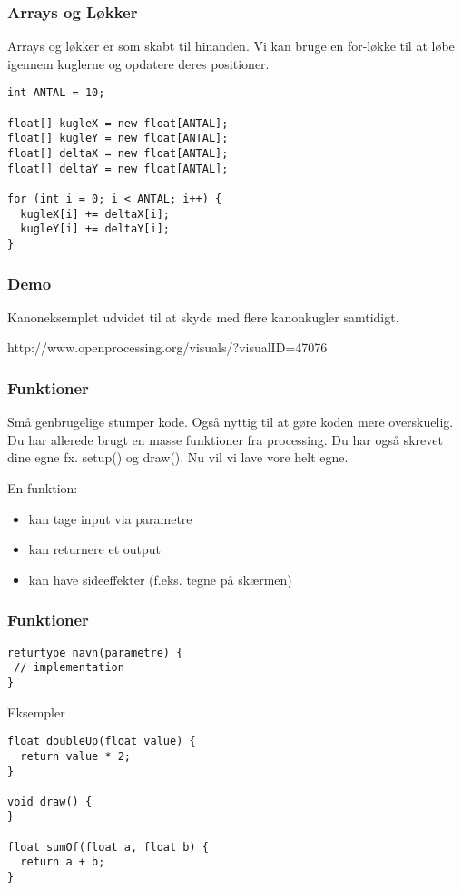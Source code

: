 \documentclass{beamer}
\begin{document}
\begin{frame}[fragile]
  \frametitle{Arrays og Løkker}
  
  Arrays og løkker er som skabt til hinanden. Vi kan bruge en for-løkke til 
  at løbe igennem kuglerne og opdatere deres positioner.

\begin{verbatim}
int ANTAL = 10;

float[] kugleX = new float[ANTAL];
float[] kugleY = new float[ANTAL];
float[] deltaX = new float[ANTAL];
float[] deltaY = new float[ANTAL];

for (int i = 0; i < ANTAL; i++) {
  kugleX[i] += deltaX[i];
  kugleY[i] += deltaY[i];
}
\end{verbatim}
  
   
\end{frame}

\begin{frame}[fragile]
  \frametitle{Demo}
  
  Kanoneksemplet udvidet til at skyde med flere kanonkugler samtidigt.
  
  http://www.openprocessing.org/visuals/?visualID=47076
  
\end{frame}


\begin{frame}[fragile]
  \frametitle{Funktioner}
  
  Små genbrugelige stumper kode. Også nyttig til at gøre koden mere overskuelig.\\
  \vspace{0.5cm}
  Du har allerede brugt en masse funktioner fra processing. Du har også skrevet dine egne fx. setup() og draw(). Nu vil vi lave vore helt egne.
  
  \begin{block}{En funktion:} 
  \begin{itemize}
  \item kan tage input via parametre
  \item kan returnere et output
  \item kan have sideeffekter (f.eks. tegne på skærmen)
  \end{itemize}
  \end{block}

\end{frame}


\begin{frame}[fragile]
  \frametitle{Funktioner}
    
\begin{verbatim}
returtype navn(parametre) {
 // implementation
}
\end{verbatim}
  
  \begin{block}{Eksempler}
\begin{verbatim}
float doubleUp(float value) {
  return value * 2;
}

void draw() {
}

float sumOf(float a, float b) {
  return a + b;
}
\end{verbatim}    
  \end{block}

\end{frame}
\end{document}
